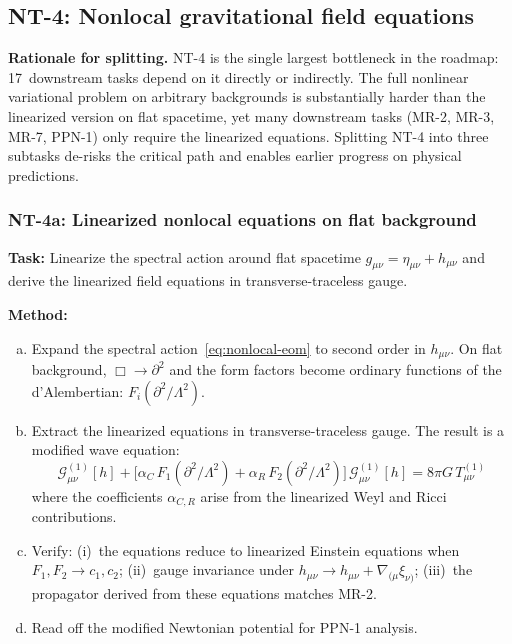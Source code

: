 \documentclass[12pt,a4paper]{article}
\newcommand{\task}[1]{\noindent\textbf{Task:} #1\par}
\newcommand{\method}[1]{\noindent\textbf{Method:} #1\par}
\begin{document}
\subsection{NT-4: Nonlocal gravitational field equations}
\label{task:NT4}

\textbf{Rationale for splitting.} NT-4 is the single largest bottleneck in the
roadmap: 17~downstream tasks depend on it directly or indirectly. The full
nonlinear variational problem on arbitrary backgrounds is substantially harder
than the linearized version on flat spacetime, yet many downstream tasks (MR-2,
MR-3, MR-7, PPN-1) only require the linearized equations. Splitting NT-4 into
three subtasks de-risks the critical path and enables earlier progress on
physical predictions.

\subsubsection{NT-4a: Linearized nonlocal equations on flat background}
\label{task:NT4a}

\task{Linearize the spectral action around flat spacetime
$g_{\mu\nu} = \eta_{\mu\nu} + h_{\mu\nu}$ and derive the linearized field
equations in transverse-traceless gauge.}

\method{
\begin{enumerate}[(a)]
  \item Expand the spectral action~\eqref{eq:nonlocal-eom} to second order
    in $h_{\mu\nu}$. On flat background, $\Box \to \partial^2$ and the form
    factors become ordinary functions of the d'Alembertian:
    $F_i(\partial^2/\Lambda^2)$.
  \item Extract the linearized equations in transverse-traceless gauge.
    The result is a modified wave equation:
    \begin{equation}
      \mathcal{G}_{\mu\nu}^{(1)}[h] +
      \bigl[\alpha_C\,F_1(\partial^2/\Lambda^2) + \alpha_R\,F_2(\partial^2/\Lambda^2)\bigr]
      \,\mathcal{G}_{\mu\nu}^{(1)}[h] = 8\pi G\,T_{\mu\nu}^{(1)}
    \end{equation}
    where the coefficients $\alpha_{C,R}$ arise from the linearized
    Weyl and Ricci contributions.
  \item Verify: (i)~the equations reduce to linearized Einstein equations when
    $F_1, F_2 \to c_1, c_2$; (ii)~gauge invariance under
    $h_{\mu\nu} \to h_{\mu\nu} + \nabla_{(\mu}\xi_{\nu)}$;
    (iii)~the propagator derived from these equations matches MR-2.
  \item Read off the modified Newtonian potential for PPN-1 analysis.
\end{enumerate}
}
\end{document}
